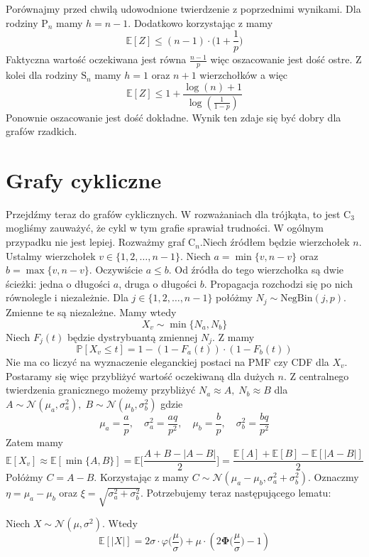 Porównajmy przed chwilą udowodnione twierdzenie z poprzednimi wynikami. Dla rodziny $\mathrm{P}_n$ mamy $h = n - 1$. Dodatkowo korzystając z  mamy
\[
    \mathbb{E}[Z] \le (n-1) \cdot \Big(1 + \frac{1}{p} \Big)
\]
Faktyczna wartość oczekiwana jest równa $\frac{n-1}{p}$ więc oszacowanie jest dość ostre. Z kolei dla rodziny $\mathrm{S}_n$ mamy $h=1$ oraz $n+1$ wierzchołków a więc
\[
    \mathbb{E}[Z] \le 1 + \frac{\log(n) + 1}{\log(\frac{1}{1-p})}
\]
Ponownie oszacowanie jest dość dokładne. Wynik ten zdaje się być dobry dla grafów rzadkich.


\section{Grafy cykliczne}

Przejdźmy teraz do grafów cyklicznych. W rozważaniach dla trójkąta, to jest $\mathrm{C}_3$ mogliśmy zauważyć, że cykl w tym grafie sprawiał trudności. W ogólnym przypadku nie jest lepiej. Rozważmy graf $\mathrm{C}_n$.Niech źródłem będzie wierzchołek $n$. Ustalmy wierzchołek $v\in\{1,2,\dots,n-1\}$. Niech $a=\min\{v,n-v\}$ oraz $b=\max\{v,n-v\}$. Oczywiście $a\le b$. Od źródła do tego wierzchołka są dwie ścieżki: jedna o długości $a$, druga o długości $b$. Propagacja rozchodzi się po nich równolegle i niezależnie. Dla $j\in \{1,2,\dots,n-1\} $ połóżmy $N_j\sim \mathrm{NegBin}(j,p)$. Zmienne te są niezależne. Mamy wtedy 
\[
    X_v \sim \min\{N_a, N_b\}
\]
Niech $F_j(t)$ będzie dystrybuantą zmiennej $N_j$. Z  mamy 
\[
    \mathbb{P}[X_v\le t] = 1 - (1-F_a(t))\cdot(1-F_b(t))
\]
Nie ma co liczyć na wyznaczenie eleganckiej postaci na PMF czy CDF dla $X_v$. Postaramy się więc przybliżyć wartość oczekiwaną dla dużych $n$. Z centralnego twierdzenia granicznego możemy przybliżyć $N_a \approx A,\; N_b \approx B$ dla $ A\sim \mathcal{N}(\mu_a,\sigma^2_a),\; B \sim \mathcal{N}(\mu_b,\sigma^2_b)$ gdzie 
\[
    \mu_a=\frac{a}{p},\quad \sigma^2_a=\frac{aq}{p^2}, \quad \mu_b=\frac{b}{p},\quad \sigma^2_b=\frac{bq}{p^2}
\]
Zatem mamy
\[
    \mathbb{E}[X_v] \approx \mathbb{E}[\min\{A,B\}]=\mathbb{E}\Big[\frac{A+B-|A-B|}{2}\Big]=\frac{\mathbb{E}[A]+\mathbb{E}[B]-\mathbb{E}[|A-B|]}{2}
\]
Połóżmy $C=A-B$. Korzystając z  mamy $C \sim \mathcal{N}(\mu_a-\mu_b,\sigma_a^2+\sigma_b^2)$. Oznaczmy $\eta=\mu_a-\mu_b$ oraz $\xi=\sqrt{\sigma_a^2+\sigma_b^2}$. Potrzebujemy teraz następującego lematu:
\begin{lemma}\label{lemma:abs_normal_E}
Niech $X \sim \mathcal{N}(\mu,\sigma^2)$. Wtedy
\[
    \mathbb{E}[|X|] = 2\sigma\cdot \varphi\Big(\frac{\mu}{\sigma}\Big)+\mu\cdot (2\mathbf{\Phi}\Big(\frac{\mu}{\sigma}\Big)-1)
\]    
\end{lemma}

